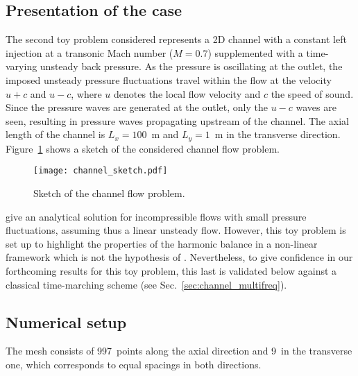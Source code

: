 \subsection{Presentation of the case}
\label{sub:presentation_of_the_case}

The second toy problem considered represents a 2D channel 
with a constant left injection at 
a transonic Mach number ($M=0.7$)
supplemented with a time-varying unsteady back pressure.
As the pressure is oscillating at the outlet, the imposed unsteady pressure
fluctuations travel within the flow at the velocity 
$u + c$ and $u - c$, where $u$ denotes 
the local flow velocity and $c$ the speed of sound.
Since the pressure waves are generated at the outlet, only
the $u-c$ waves are seen, resulting in pressure waves propagating
upstream of the channel. The axial length of the channel is $L_x = 100$~m
and $L_y = 1$~m in the transverse direction.
Figure~\ref{fig:canal_principle} shows a sketch
of the considered channel flow problem.
\begin{figure}[htb]
  \centering
  \texttt{[image: channel\_sketch.pdf]}
  \caption{Sketch of the channel flow problem.}
  \label{fig:canal_principle}
\end{figure}

\citet{Merkle1987} give an analytical solution
for incompressible flows with small pressure fluctuations, assuming
thus a linear unsteady flow.
However, this toy problem is set up to highlight the properties
of the harmonic balance in a non-linear framework which is not
the hypothesis of \citet{Merkle1987}. Nevertheless, to give confidence
in our forthcoming results for this toy problem,
this last is validated below against a classical time-marching scheme
(see Sec.~\ref{sec:channel_multifreq}).

\subsection{Numerical setup}

The mesh consists of 997~points along the axial direction and 9~in the
transverse one, which corresponds to equal spacings in both
directions. 

